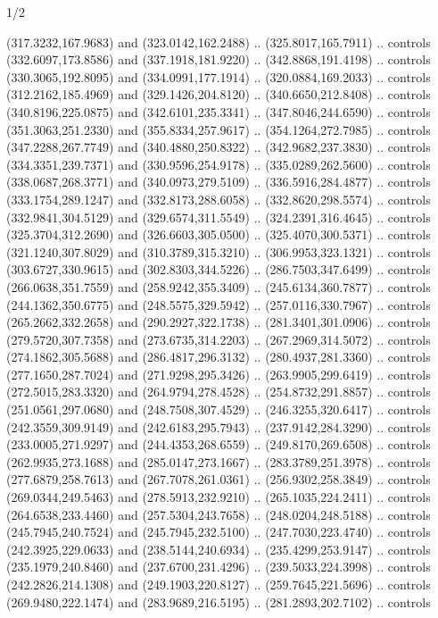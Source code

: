 \begin{flagdescription}{1/2}
\begin{scope}[xshift=0.25\flaglength,yshift=0.5\flagwidth,scale=\flagwidth/227.6]
\begin{scope}[xshift=-35mm,yshift=35.7mm,y=0.4065pt, x=0.4065pt, yscale=-1]
  (317.3232,167.9683) and (323.0142,162.2488) .. (325.8017,165.7911) .. controls
  (332.6097,173.8586) and (337.1918,181.9220) .. (342.8868,191.4198) .. controls
  (330.3065,192.8095) and (334.0991,177.1914) .. (320.0884,169.2033) .. controls
  (312.2162,185.4969) and (329.1426,204.8120) .. (340.6650,212.8408) .. controls
  (340.8196,225.0875) and (342.6101,235.3341) .. (347.8046,244.6590) .. controls
  (351.3063,251.2330) and (355.8334,257.9617) .. (354.1264,272.7985) .. controls
  (347.2288,267.7749) and (340.4880,250.8322) .. (342.9682,237.3830) .. controls
  (334.3351,239.7371) and (330.9596,254.9178) .. (335.0289,262.5600) .. controls
  (338.0687,268.3771) and (340.0973,279.5109) .. (336.5916,284.4877) .. controls
  (333.1754,289.1247) and (332.8173,288.6058) .. (332.8620,298.5574) .. controls
  (332.9841,304.5129) and (329.6574,311.5549) .. (324.2391,316.4645) .. controls
  (325.3704,312.2690) and (326.6603,305.0500) .. (325.4070,300.5371) .. controls
  (321.1240,307.8029) and (310.3789,315.3210) .. (306.9953,323.1321) .. controls
  (303.6727,330.9615) and (302.8303,344.5226) .. (286.7503,347.6499) .. controls
  (266.0638,351.7559) and (258.9242,355.3409) .. (245.6134,360.7877) .. controls
  (244.1362,350.6775) and (248.5575,329.5942) .. (257.0116,330.7967) .. controls
  (265.2662,332.2658) and (290.2927,322.1738) .. (281.3401,301.0906) .. controls
  (279.5720,307.7358) and (273.6735,314.2203) .. (267.2969,314.5072) .. controls
  (274.1862,305.5688) and (286.4817,296.3132) .. (280.4937,281.3360) .. controls
  (277.1650,287.7024) and (271.9298,295.3426) .. (263.9905,299.6419) .. controls
  (272.5015,283.3320) and (264.9794,278.4528) .. (254.8732,291.8857) .. controls
  (251.0561,297.0680) and (248.7508,307.4529) .. (246.3255,320.6417) .. controls
  (242.3559,309.9149) and (242.6183,295.7943) .. (237.9142,284.3290) .. controls
  (233.0005,271.9297) and (244.4353,268.6559) .. (249.8170,269.6508) .. controls
  (262.9935,273.1688) and (285.0147,273.1667) .. (283.3789,251.3978) .. controls
  (277.6879,258.7613) and (267.7078,261.0361) .. (256.9302,258.3849) .. controls
  (269.0344,249.5463) and (278.5913,232.9210) .. (265.1035,224.2411) .. controls
  (264.6538,233.4460) and (257.5304,243.7658) .. (248.0204,248.5188) .. controls
  (245.7945,240.7524) and (245.7945,232.5100) .. (247.7030,223.4740) .. controls
  (242.3925,229.0633) and (238.5144,240.6934) .. (235.4299,253.9147) .. controls
  (235.1979,240.8460) and (237.6700,231.4296) .. (239.5033,224.3998) .. controls
  (242.2826,214.1308) and (249.1903,220.8127) .. (259.7645,221.5696) .. controls
  (269.9480,222.1474) and (283.9689,216.5195) .. (281.2893,202.7102) .. controls

\end{scope}
\end{scope}
\end{flagdescription}
